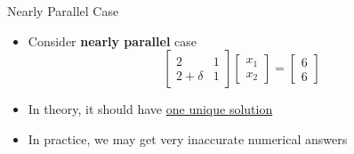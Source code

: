 \documentclass[10pt]{beamer}
\begin{document}
\begin{frame}{Nearly Parallel Case}
\begin{itemize}
    \item Consider \textbf{nearly parallel} case 
    \begin{equation*}
    \begin{bmatrix} 2 & 1 \\ 2+\delta & 1 \end{bmatrix}
    \begin{bmatrix} x_1 \\ x_2 \end{bmatrix}
    =
    \begin{bmatrix} 6 \\ 6\end{bmatrix}
    \end{equation*}
    

    \item In theory, it should have \underline{one unique solution}\\[3mm]

    \item In practice, we may get very inaccurate numerical answers

\end{itemize}
\end{frame}
\end{document}
